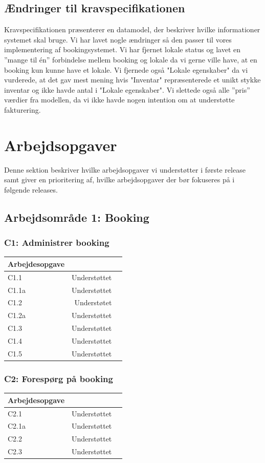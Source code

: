 \subsection{Ændringer til kravspecifikationen}
\label{Baggrund_kravspecifikationen_Aendringer}
Kravspecifikationen præsenterer en datamodel, der beskriver hvilke informationer systemet skal bruge. Vi har lavet nogle ændringer så den passer til vores implementering af bookingsystemet. Vi har fjernet lokale status og lavet en ”mange til én” forbindelse mellem booking og lokale da vi gerne ville have, at en booking kun kunne have et lokale. Vi fjernede også "Lokale egenskaber" da vi vurderede, at det gav mest mening hvis "Inventar" repræsenterede et unikt stykke inventar og ikke havde antal i "Lokale egenskaber". Vi slettede også alle ”pris” værdier fra modellen, da vi ikke havde nogen intention om at understøtte fakturering.
\section{Arbejdsopgaver}
\label{Baggrund_Arb_opgaver}
Denne sektion beskriver hvilke arbejdsopgaver vi understøtter i første release samt giver en prioritering af, hvilke arbejdsopgaver der bør fokuseres på i følgende releases.
\subsection{Arbejdsområde 1: Booking}
\label{Baggrund_Arb_opgaver_Booking}
\subsubsection{C1: Administrer booking}
\begin{tabular}{ | l | r | p{} |}
	\hline
	Arbejdesopgave & \\ 
\hline
	C1.1 & Understøttet \\ 
\hline
	C1.1a & Understøttet \\ 
\hline
	C1.2 & Understøtet \\ 
\hline
	C1.2a & Understøttet \\ 
\hline
	C1.3 & Understøttet \\ 
\hline
	C1.4 & Understøttet \\ 
\hline
	C1.5 & Understøttet \\ 
\hline
\end{tabular}

\subsubsection{C2: Forespørg på booking}
\begin{tabular}{ | l | r | p{} |}
	\hline
	Arbejdesopgave & \\ 
\hline
	C2.1 & Understøttet \\ 
\hline
	C2.1a & Understøttet \\ 
\hline
	C2.2 & Understøttet \\ 
\hline
	C2.3 & Understøttet \\ 
\hline
\end{tabular}

